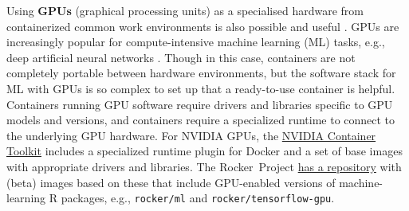 \label{rocker-gpu} Using \textbf{GPUs} (graphical processing units) as a
specialised hardware from containerized common work environments is also
possible and useful \citep{haydel_enhancing_2015}. GPUs are increasingly
popular for compute-intensive machine learning (ML) tasks, e.g., deep
artificial neural networks \citep{schmidhuber_deep_2015}. Though in this
case, containers are not completely portable between hardware
environments, but the software stack for ML with GPUs is so complex to
set up that a ready-to-use container is helpful. Containers running GPU
software require drivers and libraries specific to GPU models and
versions, and containers require a specialized runtime to connect to the
underlying GPU hardware. For NVIDIA GPUs, the
\href{https://github.com/NVIDIA/nvidia-docker}{NVIDIA Container Toolkit}
includes a specialized runtime plugin for Docker and a set of base
images with appropriate drivers and libraries. The Rocker~Project
\href{https://github.com/rocker-org/ml}{has a repository} with (beta)
images based on these that include GPU-enabled versions of
machine-learning R packages, e.g., \texttt{rocker/ml} and
\texttt{rocker/tensorflow-gpu}.

